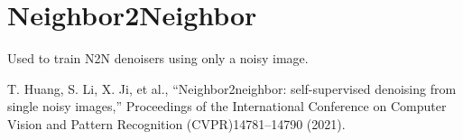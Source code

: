 \chapter{Neighbor2Neighbor}

Used to train N2N denoisers using only a noisy image.

T. Huang, S. Li, X. Ji, et al., “Neighbor2neighbor: self-supervised denoising from single noisy images,” Proceedings of the International Conference on Computer Vision and Pattern Recognition (CVPR)14781–14790 (2021).
